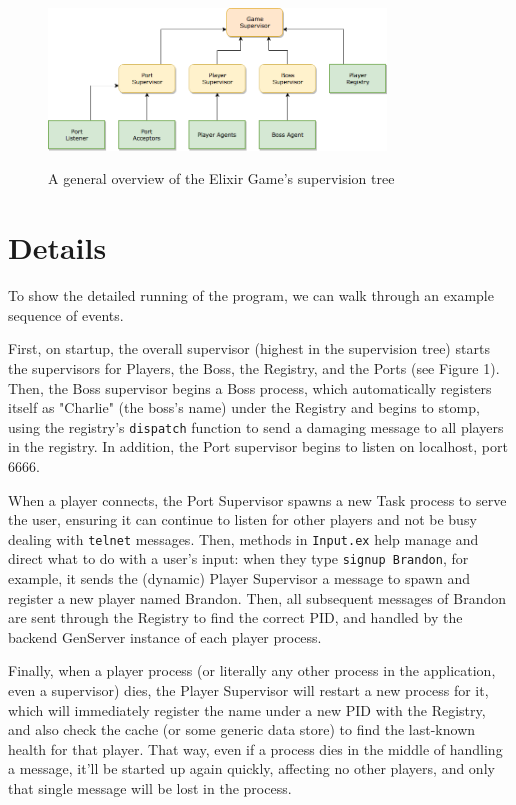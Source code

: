 \documentclass[letterpaper]{article}
\begin{document}
	\begin{figure}[h]
		\centering
		\includegraphics[width=0.8\textwidth]{Diagram}
		\\[1.5em]
		\caption{A general overview of the Elixir Game's supervision tree}
		\label{fig:mesh1}
	\end{figure}

	\section{Details}

	To show the detailed running of the program, we can walk through an example sequence of events.

	First, on startup, the overall supervisor (highest in the supervision tree) starts the supervisors for Players, the Boss, the Registry, and the Ports (see Figure 1). Then, the Boss supervisor begins a Boss process, which automatically registers itself as "Charlie" (the boss's name) under the Registry and begins to stomp, using the registry's \texttt{dispatch} function to send a damaging message to all players in the registry. In addition, the Port supervisor begins to listen on localhost, port 6666. 

	When a player connects, the Port Supervisor spawns a new Task process to serve the user, ensuring it can continue to listen for other players and not be busy dealing with \texttt{telnet} messages. Then, methods in \texttt{Input.ex} help manage and direct what to do with a user's input: when they type \texttt{signup Brandon}, for example, it sends the (dynamic) Player Supervisor a message to spawn and register a new player named Brandon. Then, all subsequent messages of Brandon are sent through the Registry to find the correct PID, and handled by the backend GenServer instance of each player process.

	Finally, when a player process (or literally any other process in the application, even a supervisor) dies, the Player Supervisor will restart a new process for it, which will immediately register the name under a new PID with the Registry, and also check the cache (or some generic data store) to find the last-known health for that player. That way, even if a process dies in the middle of handling a message, it'll be started up again quickly, affecting no other players, and only that single message will be lost in the process.
\end{document}
